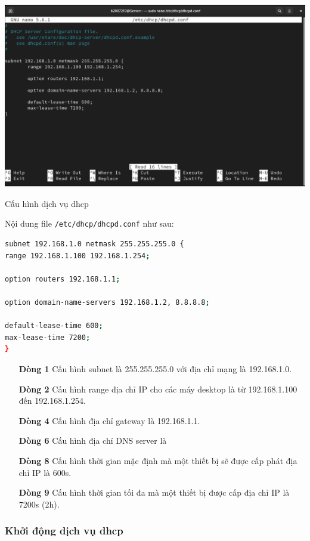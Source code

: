 \documentclass[a4paper, 11pt]{article}
\begin{document}
\begin{minipage}
    {\linewidth}
    \captionsetup{type=figure}
    \centering
    \includegraphics[width=\linewidth]{images/dhcpd-conf.png}
    \caption{Cấu hình dịch vụ dhcp}
    \label{figure:dhcpd-conf}
\end{minipage}
Nội dung file \texttt{/etc/dhcp/dhcpd.conf} như sau:
\begin{lstlisting}[language=bash, caption=Nội dung file \texttt{/etc/dhcp/dhcpd.conf}]
subnet 192.168.1.0 netmask 255.255.255.0 {
range 192.168.1.100 192.168.1.254;

option routers 192.168.1.1;

option domain-name-servers 192.168.1.2, 8.8.8.8;

default-lease-time 600;
max-lease-time 7200;
}
\end{lstlisting}
\begin{itemize}
    \item [\textbf{Dòng 1}] Cấu hình subnet là 255.255.255.0 với địa chỉ mạng là 192.168.1.0.
    \item [\textbf{Dòng 2}] Cấu hình range địa chỉ IP cho các máy desktop là từ 192.168.1.100 đến 192.168.1.254.
    \item [\textbf{Dòng 4}] Cấu hình địa chỉ gateway là 192.168.1.1.
    \item [\textbf{Dòng 6}] Cấu hình địa chỉ DNS server là
    \item [\textbf{Dòng 8}] Cấu hình thời gian mặc định mà một thiết bị sẽ được cấp phát địa chỉ IP là 600s.
    \item [\textbf{Dòng 9}] Cấu hình thời gian tối đa mà một thiết bị được cấp địa chỉ IP là 7200s (2h).
\end{itemize}

\subsubsection{Khởi động dịch vụ dhcp}
\end{document}
